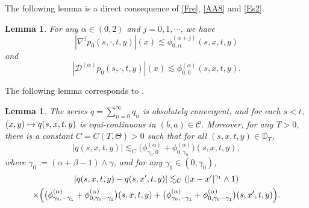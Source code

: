 \documentclass[JEP,XML,SOM,Unicode,published]{cedram}
\def\mto{\mathchoice{\longmapsto}{\mapsto}{\mapsto}{\mapsto}}
\theoremstyle{plain}
\newtheorem{lemma}[theorem]{Lemma}
\theoremstyle{definition}
\newcommand\cD{{\mathcal D}}
\newcommand\mD{\mathbb{D}}
\newcommand\1{{\mathbf{1}}}
\newcommand\sC{{\mathscr C}}
\begin{document}
The following lemma is a direct consequence of \eqref{Fre}, \eqref{AA8} and \eqref{Es2}.
\begin{lemma} \label{LEMMA_BD_PROXY}
For any $\alpha\in(0,2)$ and $j=0,1,\cdots$, we have
\begin{equation}\label{Eq19}
|\nabla^j p_0(s,\cdot,t,y)|(x)\lesssim \phi^{(\alpha+j)}_{0,\alpha}(s,x,t,y)
\end{equation}
and
\begin{equation}\label{Eq20}
|\cD^{(\alpha)} p_0(s,\cdot,t,y)|(x)\lesssim \phi^{(\alpha)}_{0,0}(s,x,t,y).
\end{equation}
\end{lemma}
The following lemma corresponds to \cite[Th.\,3.1]{Ch-Zh}.
\begin{lemma}\label{Le31}
The series $q=\sum_{n=0}^\infty q_n$
is absolutely convergent, and for each $s<t$, $(x,y)\mto q(s,x,t,y)$
is equi-continuous in $(b,a)\in\sC$. Moreover, for any $T>0$, there is a constant $C=C(T,\Theta)>0$
such that for all $(s,x,t,y)\in\mD_T$,
\begin{equation}\label{G7}
|q(s,x,t,y)|\lesssim_C\bigl(\phi^{(\alpha)}_{\gamma_0,0}+\phi^{(\alpha)}_{0,\gamma_0}\bigr)(s,x,t,y),
\end{equation}
where $\gamma_0:=(\alpha+\beta-1)\wedge\gamma$, and for any $\gamma_1\in(0,\gamma_0)$,
\begin{multline}\label{G8}
|q(s,x,t,y)-q(s,x',t,y)|\lesssim_C(|x-x'|^{\gamma_1}\wedge1)
\\
\times\Bigl(\bigl(\phi^{(\alpha)}_{\gamma_0,-\gamma_1}+\phi^{(\alpha)}_{0,\gamma_0-\gamma_1}\bigr)(s,x,t,y)
+\bigl(\phi^{(\alpha)}_{\gamma_0,-\gamma_1}+\phi^{(\alpha)}_{0,\gamma_0-\gamma_1}\bigr)(s,x',t,y)\Bigr).
\end{multline}
\end{lemma}
\end{document}
